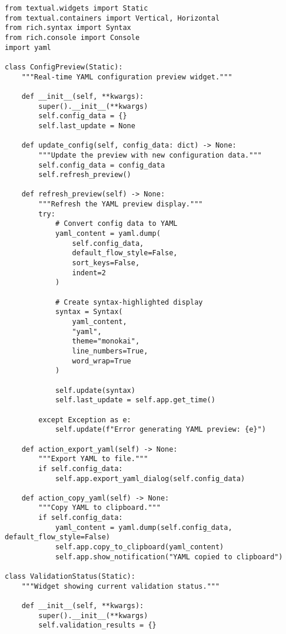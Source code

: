 \documentclass[11pt,a4paper]{article}
\begin{document}
\begin{lstlisting}[caption={ConfigPreview Implementation}]
from textual.widgets import Static
from textual.containers import Vertical, Horizontal
from rich.syntax import Syntax
from rich.console import Console
import yaml

class ConfigPreview(Static):
    """Real-time YAML configuration preview widget."""
    
    def __init__(self, **kwargs):
        super().__init__(**kwargs)
        self.config_data = {}
        self.last_update = None
        
    def update_config(self, config_data: dict) -> None:
        """Update the preview with new configuration data."""
        self.config_data = config_data
        self.refresh_preview()
        
    def refresh_preview(self) -> None:
        """Refresh the YAML preview display."""
        try:
            # Convert config data to YAML
            yaml_content = yaml.dump(
                self.config_data, 
                default_flow_style=False,
                sort_keys=False,
                indent=2
            )
            
            # Create syntax-highlighted display
            syntax = Syntax(
                yaml_content,
                "yaml",
                theme="monokai",
                line_numbers=True,
                word_wrap=True
            )
            
            self.update(syntax)
            self.last_update = self.app.get_time()
            
        except Exception as e:
            self.update(f"Error generating YAML preview: {e}")
            
    def action_export_yaml(self) -> None:
        """Export YAML to file."""
        if self.config_data:
            self.app.export_yaml_dialog(self.config_data)
            
    def action_copy_yaml(self) -> None:
        """Copy YAML to clipboard."""
        if self.config_data:
            yaml_content = yaml.dump(self.config_data, default_flow_style=False)
            self.app.copy_to_clipboard(yaml_content)
            self.app.show_notification("YAML copied to clipboard")

class ValidationStatus(Static):
    """Widget showing current validation status."""
    
    def __init__(self, **kwargs):
        super().__init__(**kwargs)
        self.validation_results = {}
        

\end{lstlisting}
\end{document}
